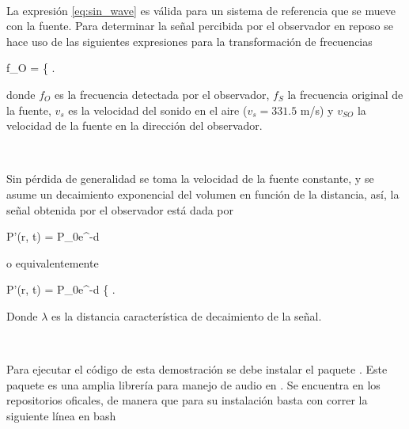 \

La expresión \ref{eq:sin_wave} es válida para un sistema de referencia que 
se mueve con la fuente. Para determinar la señal percibida por el observador
en reposo se hace uso de las siguientes expresiones para la transformación
de frecuencias


{f_O = \left\{  \right.}


donde $f_O$ es la frecuencia detectada por el observador, $f_S$ la 
frecuencia original de la fuente, $v_s$ es la velocidad del sonido en el aire 
($v_s = 331.5$ m/s) y $v_{SO}$ la velocidad de la fuente en la dirección del 
observador.

\

Sin pérdida de generalidad se toma la velocidad de la fuente constante, y
se asume un decaimiento exponencial del volumen en función de la distancia,
así, la señal obtenida por el observador está dada por

{P'(r, t) = P_0e^{-\lambda d} \sin{}}
 
o equivalentemente 

{ P'(r, t) = P_0e^{-\lambda d} 
			 \left\{  \right.}


Donde $\lambda$ es la distancia característica de decaimiento de la señal. 

\

Para ejecutar el código de esta demostración se debe instalar el paquete
\pyaudio. Este paquete es una amplia librería para manejo de audio en 
\python. Se encuentra en los repositorios oficales, de manera que para su 
instalación basta con correr la siguiente línea en bash

